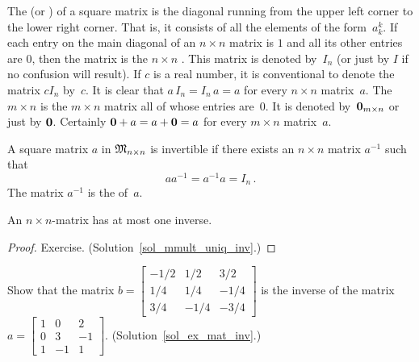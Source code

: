 \begin{defn} The
 (or
)  of a square matrix is the diagonal running from the upper left
corner to the lower right corner.  That is, it consists of all the elements of the
form~$a_k^k$.  If each entry on the main diagonal of an $n \times n$ matrix is $1$ and all its
other entries are $0$, then the matrix is the $n \times n$
.  This matrix is denoted
by~$I_n$ (or just by $I$ if no confusion will result).  If $c$ is a real number, it is
conventional to denote the matrix $cI_n$ by~$c$.  It is clear that $a\,I_n = I_n\,a = a$ for
every $n \times n$ matrix~$a$.  The $m \times n$
 is the $m \times n$ matrix all of whose entries are~$0$.  It is denoted
by~$\mathbf{0}_{m \times n}$ or just by $\mathbf{0}$. Certainly $\mathbf{0} + a = a + \mathbf{0} = a$ for every $m
\times n$ matrix~$a$.
\end{defn}

\begin{defn} A square matrix $a$ in $\mathfrak{M}_{n \times n}$ is invertible if there exists an
$n \times n$ matrix $a^{-1}$ such that
  \[ aa^{-1} = a^{-1}a = I_n\,. \]
The matrix
$a^{-1}$ is the
 of~$a$.
\end{defn}


\begin{prop}\label{mmult_uniq_inv} An $n \times n$-matrix has at most one inverse.
\end{prop}

\begin{proof} Exercise.  (Solution~\ref{sol_mmult_uniq_inv}.)  \ns  \end{proof}

\begin{exer}\label{ex_mat_inv}  Show that the matrix $b =
    \begin{bmatrix}
        -1/2 &  1/2 &  3/2 \\
         1/4 &  1/4 & -1/4 \\
         3/4 & -1/4 & -3/4
    \end{bmatrix}$ is the inverse of the matrix $a =
             \begin{bmatrix}
                    1 &  0 &  2 \\
                    0 &  3 & -1 \\
                    1 & -1 &  1
             \end{bmatrix}.$ (Solution~\ref{sol_ex_mat_inv}.)
\end{exer}


